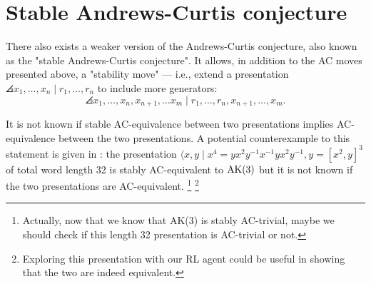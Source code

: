 
\section{Stable Andrews-Curtis conjecture\label{sec:SAC}}

There also exists a weaker version of the Andrews-Curtis conjecture, also known as the "stable Andrews-Curtis conjecture".
It allows, in addition to the AC moves presented above, a "stability move" --- i.e., extend a presentation $\angles{x_1, \dots, x_n \mid r_1, \dots, r_n}$ to include more generators:
\[
\angles{x_1, \dots, x_n, x_{n+1}, \dots x_m \mid r_1, \dots, r_n, x_{n+1}, \dots, x_m}.
\]

It is not known if stable AC-equivalence between two presentations implies AC-equivalence between the two presentations.
A potential counterexample to this statement is given in \cite{MMS}: the presentation $\langle x, y \mid x^4 = y x^2 y^{-1} x^{-1} y x^2 y^{-1}, y = [x^2, y]^3 $ of total word length 32 is stably AC-equivalent to $\text{AK}(3)$ but it is not known if the two presentations are AC-equivalent.
\footnote{Actually, now that we know that AK(3) is stably AC-trivial, maybe we should check if this length 32 presentation is AC-trivial or not.}
\footnote{Exploring this presentation with our RL agent could be useful in showing that the two are indeed equivalent.}
\newline